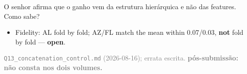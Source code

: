 \documentclass{beamer}
\begin{document}
\begin{frame}[noframenumbering]{O senhor afirma que o ganho vem da estrutura hierárquica e não das features. Como sabe?}
\begin{itemize}
        \item Fidelity: AL fold by fold; AZ/FL match the mean within 0.07/0.03, \textbf{not} fold by fold --- \textbf{open}.
    \end{itemize}
    \vfill
    {\scriptsize
    \begin{minipage}[b]{0.775\linewidth}\raggedright\textcolor{gray}{\texttt{Q13\_concatenation\_control.md} (2026-08-16); errata escrita. \textbf{pós-submissão: não consta nos dois volumes.}}\end{minipage}\hfill
    \begin{minipage}[b]{0.20\linewidth}\raggedleft \hyperlink{b0}{}\end{minipage}}
\end{frame}

\end{document}
